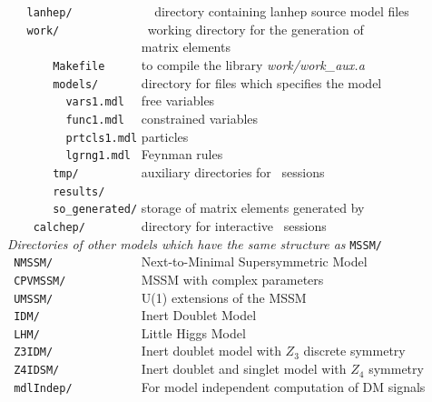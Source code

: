 \documentclass[12pt,a4paper]{article}
\begin{document}
\verb|   lanhep/            |          directory containing lanhep source model files   \\
\verb|   work/            |              \calchep\ working directory for the generation of   \\
\verb|                    |             matrix elements                                    \\
\verb|       Makefile     |  to compile the library {\it work/work\_aux.a}           \\ 
\verb|       models/      | directory for files  which specifies the model\\ 
\verb|         vars1.mdl  |  free  variables   \\
\verb|         func1.mdl  |  constrained variables   \\
\verb|         prtcls1.mdl|  particles  \\
\verb|         lgrng1.mdl |   Feynman rules\\
\verb|       tmp/         | auxiliary directories for \calchep\ sessions    \\
\verb|       results/  |                                                  \\
\verb|       so_generated/|   storage  of  matrix elements generated by \calchep \\
\verb|    calchep/        |   directory for interactive \calchep\ sessions    \\
{\it Directories of other models which have the same structure as} {\tt  MSSM/ }\\
\verb| NMSSM/             |         Next-to-Minimal Supersymmetric Model\cite{Ellwanger:2006rn,Belanger:2005kh} \\
\verb| CPVMSSM/           |         MSSM with complex parameters\cite{Lee:2003nta,  Belanger:2006qa} \\
\verb| UMSSM/             |         U(1) extensions of the MSSM\cite{DaSilva:2013jga,Belanger:2015cra} \\
\verb| IDM/               |         Inert Doublet Model\cite{Barbieri:2006dq}  \\
\verb| LHM/               |         Little Higgs Model\cite{Belyaev:2006jh} \\
\verb| Z3IDM/             |        Inert doublet model  with $Z_3$ discrete
symmetry \cite{Belanger:2012vp,Belanger:2014bga} \\
\verb| Z4IDSM/            |         Inert doublet and singlet model with $Z_4$
symmetry \cite{Belanger:2012vp,Belanger:2014bga} \\  
\verb| mdlIndep/          |           For model independent computation of DM signals                                 \\
\end{document}
